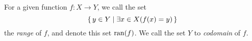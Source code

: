 \guard



\begin{defn}
\label{defn:functionRange}
  For a given function $f:X\to Y$, we call the set \[ \left\{\, y\in Y \mid \exists x\in X( f(x) = y)\,\right\}\] the \emph{range} of $f$, and denote this set $\mathrm{ran}(f)$.
  We call the set $Y$ to \emph{codomain} of $f$.
\end{defn}
